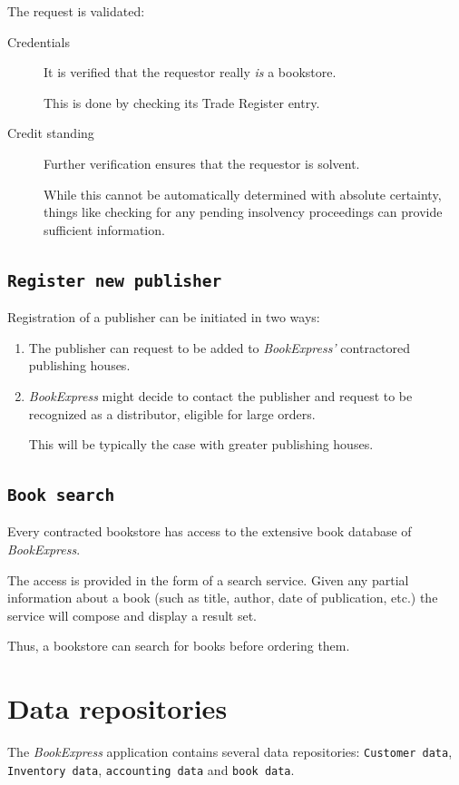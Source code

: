 The request is validated:
\begin{description}
	\item[Credentials] It is verified that the requestor really \emph{is} a bookstore.

	                   This is done by checking its Trade Register entry.
	\item[Credit standing] Further verification ensures that the requestor is solvent.

	                       While this cannot be automatically determined with absolute certainty, things like checking for any pending
						   insolvency proceedings can provide sufficient information.
\end{description}


\section{\texttt{Register new publisher}}
Registration of a publisher can be initiated in two ways:
\begin{enumerate}
	\item The publisher can request to be added to \emph{BookExpress'} contractored publishing houses.
	\item \emph{BookExpress} might decide to contact the publisher and request to be recognized as a distributor, eligible for large orders.
	      
		  This will be typically the case with greater publishing houses.
\end{enumerate}


\section{\texttt{Book search}}
Every contracted bookstore has access to the extensive book database of \emph{BookExpress}.

The access is provided in the form of a search service. Given any partial information about a book (such as title, author, date of publication, etc.)
the service will compose and display a result set.

Thus, a bookstore can search for books before ordering them.



\chapter{Data repositories}
The \emph{BookExpress} application contains several data repositories: \texttt{Customer data}, \texttt{Inventory data}, \texttt{accounting data} and \texttt{book data}.


